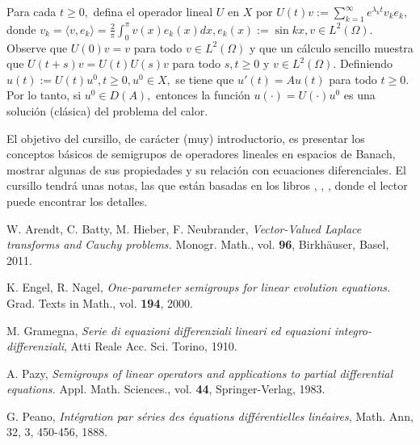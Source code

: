 \begin{titlepage}
\begin{minipage}{0.85\linewidth}
Para cada $t\geq 0,$ defina el operador lineal $U$ en $X$ por $U(t)v:=\sum_{k=1}^\infty e^{\lambda_k t}v_ke_k,$ 
donde $v_k=\langle v, e_k\rangle=\frac{2}{\pi}\int_0^\pi v(x)e_k(x) dx, e_k(x):=\sin k x, v\in L^2(\Omega).$
Observe que $U(0)v=v$ para todo $v\in L^2(\Omega)$ y que un c\'alculo sencillo muestra que $U(t+s)v=U(t)U(s)v$ para todo $s,t\geq 0$ y $v\in L^2(\Omega).$ Definiendo $u(t):=U(t)u^0, t\geq 0, u^0\in X,$ se tiene que $u'(t)=Au(t)$ para todo $t\geq 0.$ Por lo tanto, si $u^0\in D(A),$ entonces la funci\'on $u(\cdot)=U(\cdot)u^0$ es una soluci\'on (cl\'asica) del problema del calor.



El objetivo del cursillo, de car\'acter (muy) introductorio, es presentar los conceptos b\'asicos de semigrupos de operadores lineales en espacios de Banach, mostrar algunas de sus propiedades y su relaci\'on con ecuaciones diferenciales.  El cursillo tendr\'a unas notas, las que est\'an basadas en los libros \cite{Ar-Ba-Hi-Ne-11}, \cite{En-Na-00}, \cite{Pa-83}, donde el lector puede encontrar los detalles.
\end{minipage}

\vspace{10pt}


\begin{thebibliography}{99}
 W. Arendt, C. Batty, M. Hieber, F. Neubrander, {\em Vector-Valued Laplace transforms and Cauchy problems.} Monogr. Math., vol. \textbf{ 96}, Birkh\"auser, Basel, 2011.

 K. Engel, R. Nagel, {\em One-parameter semigroups for linear evolution equations.} Grad. Texts in Math., vol. {\bf 194}, 2000.

 M. Gramegna, {\em Serie di equazioni differenziali lineari ed equazioni integro-differenziali}, Atti Reale Acc. Sci. Torino, 1910.

 A. Pazy, {\em Semigroups of linear operators and applications to partial differential equations.} Appl. Math. Sciences., vol. {\bf 44}, Springer-Verlag, 1983.
    
 G. Peano, {\em  Int\'egration par s\'eries des \'equations diff\'erentielles lin\'eaires}, Math. Ann, 32, 3, 450-456, 1888.
    
\end{thebibliography}
\end{titlepage}
